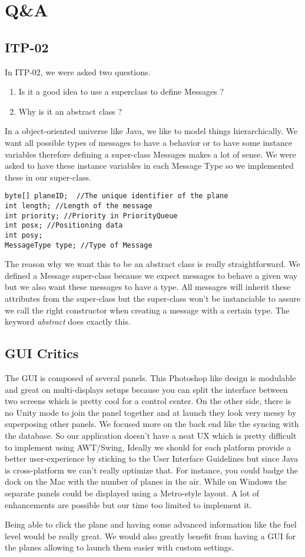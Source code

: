 \documentclass{article}
\begin{document}
\section{Q\&A}
\subsection {ITP-02}
In ITP-02, we were asked two questions. 
\begin{enumerate}
\item Is it a good idea to use a superclass to define Messages ?
\item Why is it an abstract class ?
\end{enumerate}
In a object-oriented universe like Java, we like to model things hierarchically. We want all possible types of messages to have a behavior or to have some instance variables therefore defining a super-class Messages makes a lot of sense. We were asked to have these instance variables in each Message Type so we implemented these in our super-class.

\begin{lstlisting}
byte[] planeID;  //The unique identifier of the plane
int length; //Length of the message
int priority; //Priority in PriorityQueue
int posx; //Positioning data 
int posy;
MessageType type; //Type of Message
\end{lstlisting}

The reason why we want this to be an abstract class is really straightforward. We defined a Message super-class because we expect messages to behave a given way but we also want these messages to have a type. All messages will inherit these attributes from the super-class but the super-class won't be instanciable to assure we call the right constructor when creating a message with a certain type. The keyword \emph{abstract} does exactly this. 

\subsection {GUI Critics}

The GUI is composed of several panels. This Photoshop like design is modulable and great on multi-displays setups because you can split the interface between two screens which is pretty cool for a control center. On the other side, there is no Unity mode to join the panel together and at launch they look very messy by superposing other panels. We focused more on the back end like the syncing with the database. So our application doesn't have a neat UX which is pretty difficult to implement using AWT/Swing, Ideally we should for each platform provide a better user-experience by sticking to the User Interface Guidelines but since Java is cross-platform we can't really optimize that.
For instance, you could badge the dock on the Mac with the number of planes in the air. While on Windows the separate panels could be displayed using a Metro-style layout. A lot of enhancements are possible but our time too limited to implement it.

Being able to click the plane and having some advanced information like the fuel level would be really great. We would also greatly benefit from having a GUI for the planes allowing to launch them easier with custom settings.
 
\end{document}
